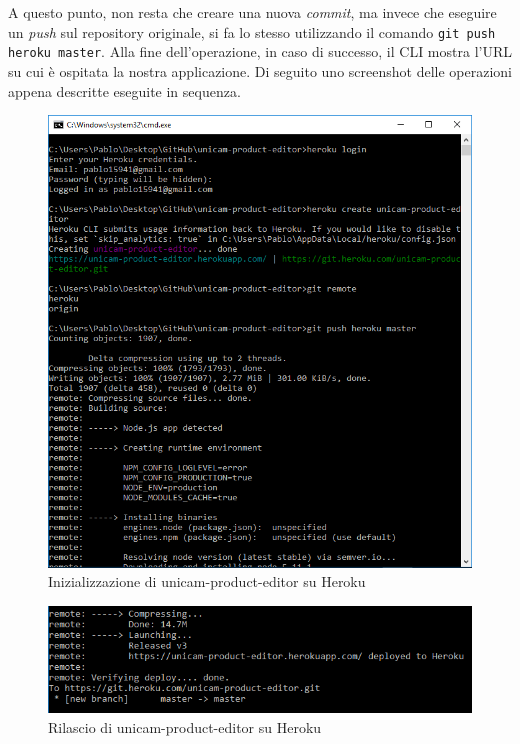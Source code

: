 A questo punto, non resta che creare una nuova \emph{commit}, ma invece che eseguire un \emph{push} sul repository originale, si fa lo stesso utilizzando il comando \texttt{git push heroku master}.
Alla fine dell'operazione, in caso di successo, il CLI mostra l'URL su cui è ospitata la nostra applicazione.
Di seguito uno screenshot delle operazioni appena descritte eseguite in sequenza.
\begin{figure}[h]
	\centering
	\includegraphics[scale=0.7]{Immagini/heroku_initialize.png}
	\caption{Inizializzazione di unicam-product-editor su Heroku}
\end{figure}
\begin{figure}[h]
	\centering
	\includegraphics[scale=0.8]{Immagini/heroku_deployment.png}
	\caption{Rilascio di unicam-product-editor su Heroku}
\end{figure}